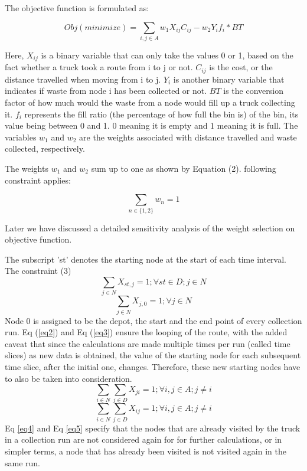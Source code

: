 \documentclass[12pt]{article}
\begin{document}
The objective function is formulated as:

\begin{equation}\label{eq1}
    Obj(minimize)=\sum_{i,j \in A} w_1 X_{ij} C_{ij} - w_2 Y_i f_i * BT
\end{equation}

Here, $X_{ij}$ is a binary variable that can only take the values 0 or 1, based on the fact whether a truck took a route from i to j or not. $C_{ij}$ is the cost, or the distance travelled when moving from i to j. $Y_{i}$ is another binary variable that indicates if waste from node i has been collected or not. $BT$ is the conversion factor of how much would the waste from a node would fill up a truck collecting it. $f_i$ represents the fill ratio (the percentage of how full the bin is) of the bin, its value being between 0 and 1. 0 meaning it is empty and 1 meaning it is full. The variables $w_1$ and $w_2$ are the weights associated with distance travelled and waste collected, respectively.

The weights $w_1$ and $w_2$ sum up to one as shown by Equation (2). following constraint applies:

\begin{equation}\label{eq1.5}
    \sum_{n\in \{1,2\}} w_n = 1
\end{equation}

Later we have discussed a detailed sensitivity analysis of the weight selection on objective function. 

The subscript 'st' denotes the starting node at the start of each time interval. The constraint (3) 
\begin{equation}\label{eq2}
    \sum_{j\in N}X_{st,j}=1 ; \forall st \in D ; j \in N
\end{equation}
\begin{equation}\label{eq3}
    \sum_{j\in N}X_{j,0}=1 ; \forall j \in N
\end{equation}
Node 0 is assigned to be the depot, the start and the end point of every collection run. Eq (\ref{eq2}) and Eq (\ref{eq3}) ensure the looping of the route, with the added caveat that since the calculations are made multiple times per run (called time slices) as new data is obtained, the value of the starting node for each subsequent time slice, after the initial one, changes. Therefore, these new starting nodes have to also be taken into consideration.
\begin{equation}\label{eq4}
    \sum_{i\in N}\sum_{j\in D } X_{ji}=1 ; \forall i,j \in A ; j\ne i
\end{equation}
\begin{equation}\label{eq5}
    \sum_{i\in N}\sum_{j\in D } X_{ij}=1 ; \forall i,j \in A ; j\ne i
\end{equation}
Eq \eqref{eq4} and Eq \eqref{eq5} specify that the nodes that are already visited by the truck in a collection run are not considered again for for further calculations, or in simpler terms, a node that has already been visited is not visited again in the same run.
\end{document}

